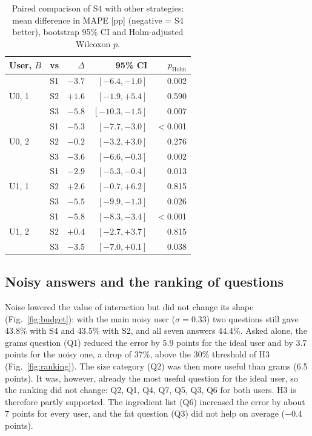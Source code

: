 \documentclass[twocolumn]{svjour3}
\begin{document}
\begin{table}[t]
  \centering
  \caption{Paired comparison of S4 with other strategies: mean difference in MAPE [pp] (negative = S4
  better), bootstrap 95\% CI and Holm-adjusted Wilcoxon $p$.}
  \label{tab:tests}
  \setlength{\tabcolsep}{2.6pt}
  \begin{tabular}{@{}llrrr@{}}
    \toprule
    User, $B$ & vs & $\Delta$ & 95\% CI & $p_{\text{Holm}}$ \\
    \midrule
    \multirow{3}{*}{U0, 1} & S1 & $-3.7$ & $[-6.4, -1.0]$ & 0.002 \\
                           & S2 & $+1.6$ & $[-1.9, +5.4]$ & 0.590 \\
                           & S3 & $-5.8$ & $[-10.3, -1.5]$ & 0.007 \\
    \midrule
    \multirow{3}{*}{U0, 2} & S1 & $-5.3$ & $[-7.7, -3.0]$ & $<$0.001 \\
                           & S2 & $-0.2$ & $[-3.2, +3.0]$ & 0.276 \\
                           & S3 & $-3.6$ & $[-6.6, -0.3]$ & 0.002 \\
    \midrule
    \multirow{3}{*}{U1, 1} & S1 & $-2.9$ & $[-5.3, -0.4]$ & 0.013 \\
                           & S2 & $+2.6$ & $[-0.7, +6.2]$ & 0.815 \\
                           & S3 & $-5.5$ & $[-9.9, -1.3]$ & 0.026 \\
    \midrule
    \multirow{3}{*}{U1, 2} & S1 & $-5.8$ & $[-8.3, -3.4]$ & $<$0.001 \\
                           & S2 & $+0.4$ & $[-2.7, +3.7]$ & 0.815 \\
                           & S3 & $-3.5$ & $[-7.0, +0.1]$ & 0.038 \\
    \bottomrule
  \end{tabular}
\end{table}

\subsection{Noisy answers and the ranking of questions}
Noise lowered the value of interaction but did not change its shape (Fig.~\ref{fig:budget}): with the main
noisy user ($\sigma=0.33$) two questions still gave 43.8\% with S4 and 43.5\% with S2, and all seven answers
44.4\%. Asked alone, the grams question (Q1) reduced the error by 5.9 points for the ideal user and by 3.7
points for the noisy one, a drop of 37\%, above the 30\% threshold of H3 (Fig.~\ref{fig:ranking}). The size
category (Q2) was then more useful than grams (6.5 points). It was, however, already the most useful
question for the ideal user, so the ranking did not change: Q2, Q1, Q4, Q7, Q5, Q3, Q6 for both users. H3 is
therefore partly supported. The ingredient list (Q6) increased the error by about 7 points for every user,
and the fat question (Q3) did not help on average ($-0.4$ points).
\end{document}
